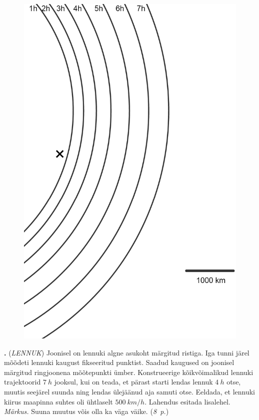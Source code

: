 \documentclass[12pt,a5paper]{article}
\newcommand{\numb}[1]{\vspace{5pt}\textbf{\large #1}}
\newcommand{\nimi}[1]{(\textsl{\small #1})}
\newcommand{\punktid}[1]{(\emph{#1~p.})}
\newcounter{ylesanne}
\newcommand{\yl}[1]{\addtocounter{ylesanne}{1}\numb{\theylesanne.} \nimi{#1} \newblock{}}
\begin{document}
\begin{figure}
  \vspace{-28pt}
  \begin{center}
  \includegraphics[scale=0.2]{LennukProblem.png}
  \end{center}
  \vspace{-20pt}
\end{figure}


\yl{LENNUK} Joonisel on lennuki algne asukoht märgitud ristiga. Iga tunni järel mõõdeti lennuki kaugust fikseeritud punktist. Saadud kaugused on joonisel märgitud ringjoonena mõõtepunkti ümber. Konstrueerige kõikvõimalikud lennuki trajektoorid $\SI{7}{h}$ jooksul, kui on teada, et pärast starti lendas lennuk $\SI{4}{h}$ otse, muutis seejärel suunda ning lendas ülejäänud aja samuti otse. Eeldada, et lennuki kiirus maapinna suhtes oli ühtlaselt $\SI{500}{km/h}$. Lahendus esitada lisalehel.
\textit{Märkus.} Suuna muutus võis olla ka väga väike. \punktid{8}
\newpage
\end{document}
